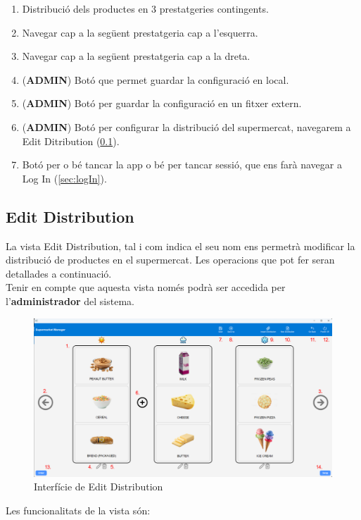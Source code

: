 \documentclass[a4paper,12pt]{article}
\begin{document}
	\begin{enumerate}[itemsep=0pt, topsep=0pt]
		\item Distribució dels productes en 3 prestatgeries contingents.
		\item Navegar cap a la següent prestatgeria cap a l'esquerra.
		\item Navegar cap a la següent prestatgeria cap a la dreta.
		\item (\textbf{ADMIN}) Botó que permet guardar la configuració en local.
		\item (\textbf{ADMIN}) Botó per guardar la configuració en un fitxer extern.
		\item (\textbf{ADMIN}) Botó per configurar la distribució del supermercat, navegarem a Edit Ditribution (\ref{sec:editDistribution}).
		\item Botó per o bé tancar la app o bé per tancar sessió, que ens farà navegar a Log In (\ref{sec:logIn}).
	\end{enumerate}
	
	\newpage
	\subsection{Edit Distribution}
	\label{sec:editDistribution}
	
	La vista Edit Distribution, tal i com indica el seu nom ens permetrà modificar la distribució de productes en el supermercat. Les operacions que pot fer seran detallades a continuació. \\
	
	Tenir en compte que aquesta vista només podrà ser accedida per l'\textbf{administrador} del sistema.
	
	\begin{figure}[H] 
		\centering
		\includegraphics[width=0.75\linewidth]{assets/editdistribution.png}
		\caption{Interfície de Edit Distribution}
	\end{figure}
	
	\noindent Les funcionalitats de la vista són:
	
\end{document}
